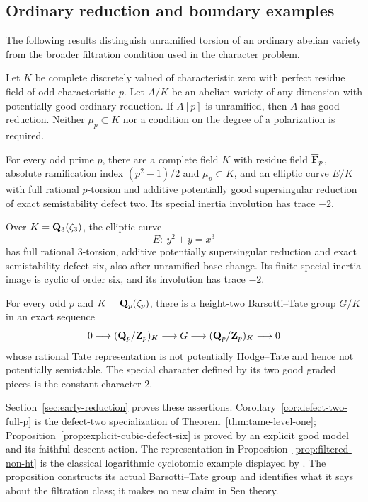 \subsection{Ordinary reduction and boundary examples}
The following results distinguish unramified torsion of an ordinary abelian variety from the broader filtration condition used in the character problem.

\begin{theorem}\label{thm:ordinary-unramified-p}
Let $K$ be complete discretely valued of characteristic zero with perfect residue field of odd characteristic $p$. Let $A/K$ be an abelian variety of any dimension with potentially good ordinary reduction. If $A[p]$ is unramified, then $A$ has good reduction. Neither $\mu_p\subset K$ nor a condition on the degree of a polarization is required.
\end{theorem}

\begin{corollary}\label{cor:defect-two-full-p}
For every odd prime $p$, there are a complete field $K$ with residue field $\overline{\mathbf F}_p$, absolute ramification index $(p^2-1)/2$ and $\mu_p\subset K$, and an elliptic curve $E/K$ with full rational $p$-torsion and additive potentially good supersingular reduction of exact semistability defect two. Its special inertia involution has trace $-2$.
\end{corollary}

\begin{proposition}\label{prop:explicit-cubic-defect-six}
Over $K=\mathbf Q_3(\zeta_3)$, the elliptic curve
\[
                         E:\ y^2+y=x^3
\]
has full rational $3$-torsion, additive potentially supersingular reduction and exact semistability defect six, also after unramified base change. Its finite special inertia image is cyclic of order six, and its involution has trace $-2$.
\end{proposition}

\begin{proposition}\label{prop:filtered-non-ht}
For every odd $p$ and $K=\mathbf Q_p(\zeta_p)$, there is a height-two Barsotti--Tate group $G/K$ in an exact sequence
\[
0\longrightarrow(\mathbf Q_p/\mathbf Z_p)_K\longrightarrow G
 \longrightarrow(\mathbf Q_p/\mathbf Z_p)_K\longrightarrow0
\]
whose rational Tate representation is not potentially Hodge--Tate and hence not potentially semistable. The special character defined by its two good graded pieces is the constant character $2$.
\end{proposition}

Section~\ref{sec:early-reduction} proves these assertions. Corollary~\ref{cor:defect-two-full-p} is the defect-two specialization of Theorem~\ref{thm:tame-level-one}; Proposition~\ref{prop:explicit-cubic-defect-six} is proved by an explicit good model and its faithful descent action. The representation in Proposition~\ref{prop:filtered-non-ht} is the classical logarithmic cyclotomic example displayed by \citet[Section~II.1.2, p.~9 of the 2002 author version]{Berger2004}. The proposition constructs its actual Barsotti--Tate group and identifies what it says about the filtration class; it makes no new claim in Sen theory.
